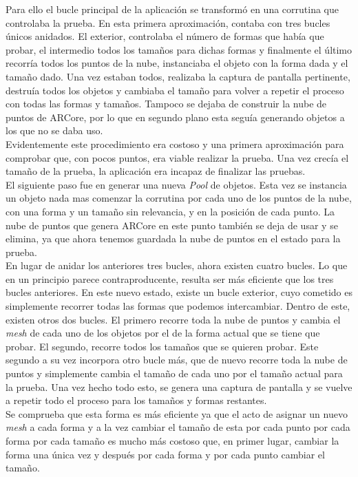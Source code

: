 Para ello el bucle principal de la aplicación se transformó en una corrutina que controlaba la prueba. En esta primera aproximación, contaba con tres bucles únicos anidados. El exterior, controlaba el número de formas que había que probar, el intermedio todos los tamaños para dichas formas y finalmente el último recorría todos los puntos de la nube, instanciaba el objeto con la forma dada y el tamaño dado. Una vez estaban todos, realizaba la captura de pantalla pertinente, destruía todos los objetos y cambiaba el tamaño para volver a repetir el proceso con todas las formas y tamaños. Tampoco se dejaba de construir la nube de puntos de ARCore, por lo que en segundo plano esta seguía generando objetos a los que no se daba uso.\\

Evidentemente este procedimiento era costoso y una primera aproximación para comprobar que, con pocos puntos, era viable realizar la prueba. Una vez crecía el tamaño de la prueba, la aplicación era incapaz de finalizar las pruebas.\\

El siguiente paso fue en generar una nueva \textit{Pool} de objetos. Esta vez se instancia un objeto nada mas comenzar la corrutina por cada uno de los puntos de la nube, con una forma y un tamaño sin relevancia, y en la posición de cada punto. La nube de puntos que genera ARCore en este punto también se deja de usar y se elimina, ya que ahora tenemos guardada la nube de puntos en el estado para la prueba.\\

En lugar de anidar los anteriores tres bucles, ahora existen cuatro bucles. Lo que en un principio parece contraproducente, resulta ser más eficiente que los tres bucles anteriores. En este nuevo estado, existe un bucle exterior, cuyo cometido es simplemente recorrer todas las formas que podemos intercambiar. Dentro de este, existen otros dos bucles. El primero recorre toda la nube de puntos y cambia el \textit{mesh} de cada uno de los objetos por el de la forma actual que se tiene que probar. El segundo, recorre todos los tamaños que se quieren probar. Este segundo a su vez incorpora otro bucle más, que de nuevo recorre toda la nube de puntos y simplemente cambia el tamaño de cada uno por el tamaño actual para la prueba. Una vez hecho todo esto, se genera una captura de pantalla y se vuelve a repetir todo el proceso para los tamaños y formas restantes.\\

Se comprueba que esta forma es más eficiente ya que el acto de asignar un nuevo \textit{mesh} a cada forma y a la vez cambiar el tamaño de esta por cada punto por cada forma por cada tamaño es mucho más costoso que, en primer lugar, cambiar la forma una única vez y después por cada forma y por cada punto cambiar el tamaño.\\      